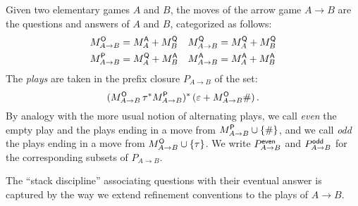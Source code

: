 \begin{definition} %
Given two elementary games $A$ and $B$,
the moves of the arrow game $A \rightarrow B$
are the questions and answers of $A$ and $B$,
categorized as follows:
\begin{align*}
  M_{A \rightarrow B}^{ \mathsf{O} } &= M_A^{ \mathsf{A} } + M_B^{ \mathsf{Q} } &
  M_{A \rightarrow B}^{ \mathsf{Q} } &= M_A^{ \mathsf{Q} } + M_B^{ \mathsf{Q} } \\
  M_{A \rightarrow B}^{ \mathsf{P} } &= M_A^{ \mathsf{Q} } + M_B^{ \mathsf{A} } &
  M_{A \rightarrow B}^{ \mathsf{A} } &= M_A^{ \mathsf{A} } + M_B^{ \mathsf{A} }
\end{align*}
The \emph{plays} are taken in
the prefix closure $P_{A \rightarrow B}$ of the set:
\[
    (M_{A \rightarrow B}^{ \mathsf{O} } \, \tau^*
     M_{A \rightarrow B}^{ \mathsf{P} })^* \,
    (\varepsilon + M_{A \rightarrow B}^{ \mathsf{O} } \#) \,.
\]
By analogy with the more usual notion of alternating plays,
we call \emph{even}
the empty play and the plays ending in
a move from $M_{A \rightarrow B}^{ \mathsf{P} } \cup \{\#\}$, and
we call \emph{odd} the plays ending in
a move from $M_{A \rightarrow B}^{ \mathsf{O} } \cup \{\tau\}$.
We write $P_{A \rightarrow B}^{ \mathsf{even} }$ and $P_{A \rightarrow B}^{ \mathsf{odd} }$
for the corresponding subsets of $P_{A \rightarrow B}$.
\end{definition}

The ``stack discipline'' associating questions
with their eventual answer is captured by
the way we extend refinement conventions to
the plays of $A \rightarrow B$.

